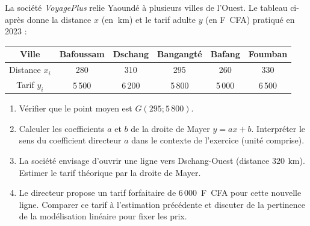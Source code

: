 \documentclass[11pt]{article}
\begin{document}
\begin{exercice}
La société \textit{VoyagePlus} relie Yaoundé à plusieurs villes de l'Ouest. Le tableau ci-après donne la distance $x$ (en $\SI{}{\kilo\meter}$) et le tarif adulte $y$ (en F~CFA) pratiqué en 2023 :
\begin{center}
\begin{tabular}{|c|c|c|c|c|c|}
\hline
Ville & Bafoussam & Dschang & Bangangté & Bafang & Foumban \\ \hline
Distance $x_i$ & 280 & 310 & 295 & 260 & 330 \\ \hline
Tarif $y_i$ & 5\,500 & 6\,200 & 5\,800 & 5\,000 & 6\,500 \\ \hline
\end{tabular}
\end{center}
\begin{enumerate}
    \item Vérifier que le point moyen est $G(295 ; 5\,800)$.
    \item Calculer les coefficients $a$ et $b$ de la droite de Mayer $y = ax + b$. Interpréter le sens du coefficient directeur $a$ dans le contexte de l'exercice (unité comprise).
    \item La société envisage d'ouvrir une ligne vers Dschang-Ouest (distance $320\,\SI{}{\kilo\meter}$). Estimer le tarif théorique par la droite de Mayer.
    \item Le directeur propose un tarif forfaitaire de $6\,000$~F~CFA pour cette nouvelle ligne. Comparer ce tarif à l'estimation précédente et discuter de la pertinence de la modélisation linéaire pour fixer les prix.
\end{enumerate}
\end{exercice}
\end{document}
